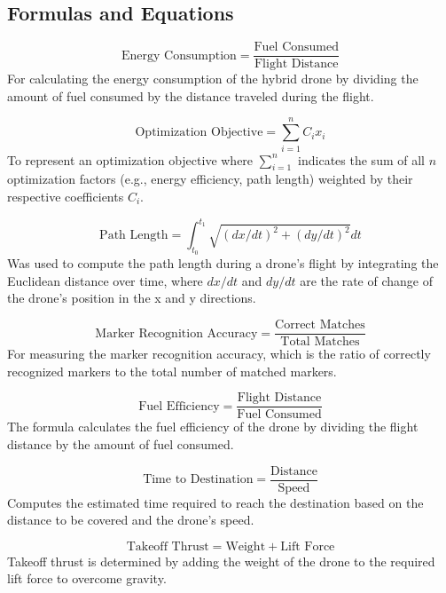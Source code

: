 \documentclass[preprint,12pt]{elsarticle}
\begin{document}
\subsection{Formulas and Equations}

\begin{equation}
\text{Energy Consumption} = \frac{\text{Fuel Consumed}}{\text{Flight Distance}}
\end{equation}
For calculating the energy consumption of the hybrid drone by dividing the amount of fuel consumed by the distance traveled during the flight.

\begin{equation}
\text{Optimization Objective} = \sum_{i=1}^{n} C_i x_i
\end{equation}
To represent an optimization objective where \(\sum_{i=1}^{n}\) indicates the sum of all \(n\) optimization factors (e.g., energy efficiency, path length) weighted by their respective coefficients \(C_i\).

\begin{equation}
\text{Path Length} = \int_{t_0}^{t_1} \sqrt{(dx/dt)^2 + (dy/dt)^2} dt
\end{equation}
Was used to compute the path length during a drone's flight by integrating the Euclidean distance over time, where \(dx/dt\) and \(dy/dt\) are the rate of change of the drone's position in the x and y directions.

\begin{equation}
\text{Marker Recognition Accuracy} = \frac{\text{Correct Matches}}{\text{Total Matches}}
\end{equation}
For measuring the marker recognition accuracy, which is the ratio of correctly recognized markers to the total number of matched markers.

\begin{equation}
\text{Fuel Efficiency} = \frac{\text{Flight Distance}}{\text{Fuel Consumed}}
\end{equation}
The formula calculates the fuel efficiency of the drone by dividing the flight distance by the amount of fuel consumed.

\begin{equation}
\text{Time to Destination} = \frac{\text{Distance}}{\text{Speed}}
\end{equation}
Computes the estimated time required to reach the destination based on the distance to be covered and the drone's speed.

\begin{equation}
\text{Takeoff Thrust} = \text{Weight} + \text{Lift Force}
\end{equation}
Takeoff thrust is determined by adding the weight of the drone to the required lift force to overcome gravity.
\end{document}
